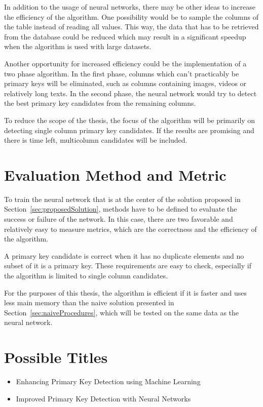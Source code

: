 \documentclass[a4paper]{article}
\begin{document}
In addition to the usage of neural networks, there may be other ideas to increase the efficiency of the algorithm. One possibility would be to sample the columns of the table instead of reading all values. This way, the data that has to be retrieved from the database could be reduced which may result in a significant speedup when the algorithm is used with large datasets.

Another opportunity for increased efficiency could be the implementation of a two phase algorithm. In the first phase, columns which can't practicably be primary keys will be eliminated, such as columns containing images, videos or relatively long texts. In the second phase, the neural network would try to detect the best primary key candidates from the remaining columns.

To reduce the scope of the thesis, the focus of the algorithm will be primarily on detecting single column primary key candidates. If the results are promising and there is time left, multicolumn candidates will be included.


\section{Evaluation Method and Metric}
To train the neural network that is at the center of the solution proposed in Section~\ref{sec:proposedSolution}, methods have to be defined to evaluate the success or failure of the network. In this case, there are two favorable and relatively easy to measure metrics, which are the correctness and the efficiency of the algorithm.

A primary key candidate is correct when it has no duplicate elements and no subset of it is a primary key. These requirements are easy to check, especially if the algorithm is limited to single column candidates.

For the purposes of this thesis, the algorithm is efficient if it is faster and uses less main memory than the naive solution presented in Section~\ref{sec:naiveProcedures}, which will be tested on the same data as the neural network.


\section{Possible Titles}
\begin{itemize}
  \item Enhancing Primary Key Detection using Machine Learning
  \item Improved Primary Key Detection with Neural Networks
\end{itemize}
\end{document}
